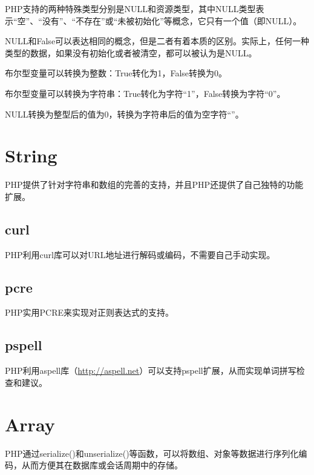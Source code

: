 PHP支持的两种特殊类型分别是NULL和资源类型，其中NULL类型表示“空”、“没有”、“不存在”或“未被初始化”等概念，它只有一个值（即NULL）。

NULL和False可以表达相同的概念，但是二者有着本质的区别。实际上，任何一种类型的数据，如果没有初始化或者被清空，都可以被认为是NULL。

\begin{compactitem}
\item 布尔型变量可以转换为整数：True转化为1，False转换为0。

\item 布尔型变量可以转换为字符串：True转化为字符“1”，False转换为字符“0”。
\end{compactitem}

NULL转换为整型后的值为0，转换为字符串后的值为空字符“”。









\section{String}

PHP提供了针对字符串和数组的完善的支持，并且PHP还提供了自己独特的功能扩展。

\subsection{curl}

PHP利用curl库可以对URL地址进行解码或编码，不需要自己手动实现。

\subsection{pcre}

PHP实用PCRE来实现对正则表达式的支持。

\subsection{pspell}

PHP利用aspell库（\url{http://aspell.net}）可以支持pspell扩展，从而实现单词拼写检查和建议。


\section{Array}



PHP通过serialize()和unserialize()等函数，可以将数组、对象等数据进行序列化编码，从而方便其在数据库或会话周期中的存储。



